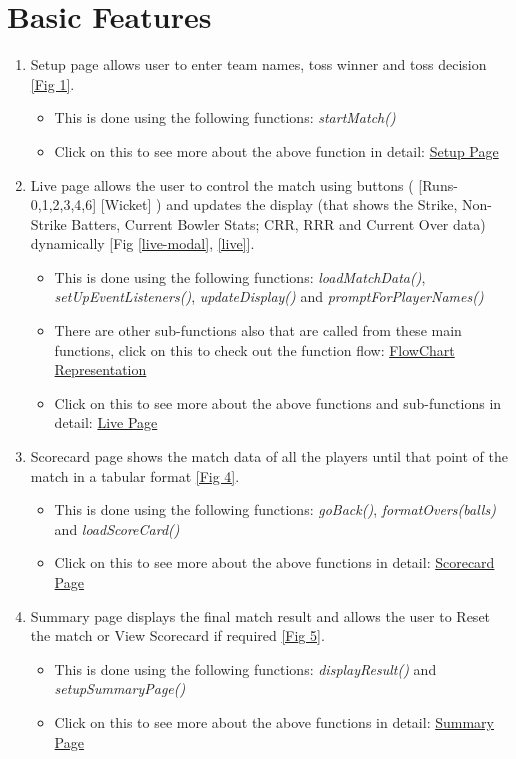 \documentclass[a4paper,12pt]{article}
\begin{document}
\section{Basic Features}
\begin{enumerate}
\item Setup page allows user to enter team names, toss winner and toss decision \hyperref[homepage]{[Fig 1]}.
  \begin{itemize}
  \item This is done using the following functions: \textit{startMatch()}
  \item Click on this to see more about the above function in detail: \hyperref[basic1]{Setup Page}
  \end{itemize}
\item Live page allows the user to control the match using buttons ( [Runs-0,1,2,3,4,6] [Wicket] ) and updates the display (that shows the Strike, Non-Strike Batters, Current Bowler Stats; CRR, RRR and Current Over data) dynamically [Fig \ref{live-modal}, \ref{live}].
  \begin{itemize}
  \item This is done using the following functions: \textit{loadMatchData()}, \textit{setUpEventListeners()}, \textit{updateDisplay()} and \textit{promptForPlayerNames()}
  \item There are other sub-functions also that are called from these main functions, click on this to check out the function flow: \hyperref[flowchart]{FlowChart Representation}
  \item Click on this to see more about the above functions and sub-functions in detail: \hyperref[basic2]{Live Page}
  \end{itemize}
\item Scorecard page shows the match data of all the players until that point of the match in a tabular format \hyperref[scorecard]{[Fig 4]}.
  \begin{itemize}
  \item This is done using the following functions: \textit{goBack()}, \textit{formatOvers(balls)} and \textit{loadScoreCard()}
  \item Click on this to see more about the above functions in detail: \hyperref[basic3]{Scorecard Page}
  \end{itemize}
\item Summary page displays the final match result and allows the user to Reset the match or View Scorecard if required \hyperref[summary]{[Fig 5]}.
  \begin{itemize}
  \item This is done using the following functions: \textit{displayResult()} and \textit{setupSummaryPage()}
  \item Click on this to see more about the above functions in detail: \hyperref[basic4]{Summary Page}
  \end{itemize}
\end{enumerate}
\end{document}
